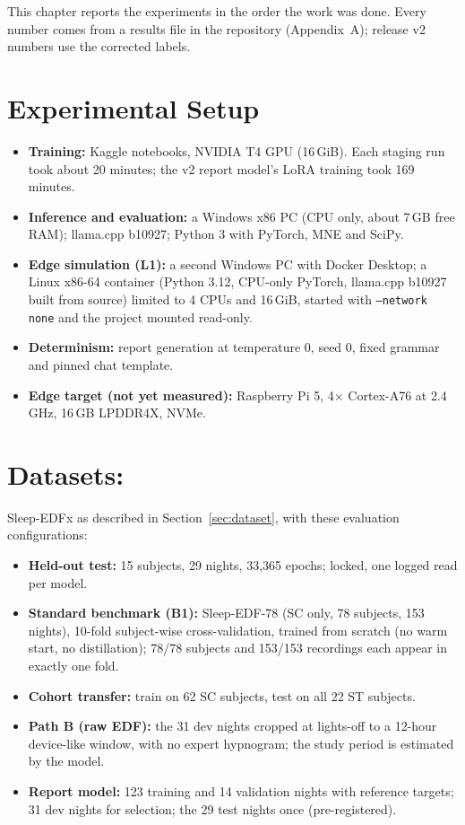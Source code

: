 \label{chap.4}
This chapter reports the experiments in the order the work was done. Every number comes from a results file in the
repository (Appendix~A); release v2 numbers use the corrected labels.

\section{Experimental Setup}

\begin{itemize}
  \item \textbf{Training:} Kaggle notebooks, NVIDIA T4 GPU (16\,GiB). Each staging run took about 20 minutes; the v2
  report model's LoRA training took 169 minutes.
  \item \textbf{Inference and evaluation:} a Windows x86 PC (CPU only, about 7\,GB free RAM); llama.cpp b10927;
  Python 3 with PyTorch, MNE and SciPy.
  \item \textbf{Edge simulation (L1):} a second Windows PC with Docker Desktop; a Linux x86-64 container (Python
  3.12, CPU-only PyTorch, llama.cpp b10927 built from source) limited to 4 CPUs and 16\,GiB, started with
  \texttt{--network none} and the project mounted read-only.
  \item \textbf{Determinism:} report generation at temperature 0, seed 0, fixed grammar and pinned chat template.
  \item \textbf{Edge target (not yet measured):} Raspberry Pi 5, 4$\times$ Cortex-A76 at 2.4\,GHz, 16\,GB LPDDR4X, NVMe.
\end{itemize}

\section{Datasets:}

Sleep-EDFx as described in Section~\ref{sec:dataset}, with these evaluation configurations:
\begin{itemize}
  \item \textbf{Held-out test:} 15 subjects, 29 nights, 33,365 epochs; locked, one logged read per model.
  \item \textbf{Standard benchmark (B1):} Sleep-EDF-78 (SC only, 78 subjects, 153 nights), 10-fold subject-wise
  cross-validation, trained from scratch (no warm start, no distillation); 78/78 subjects and 153/153 recordings
  each appear in exactly one fold.
  \item \textbf{Cohort transfer:} train on 62 SC subjects, test on all 22 ST subjects.
  \item \textbf{Path B (raw EDF):} the 31 dev nights cropped at lights-off to a 12-hour device-like window, with no
  expert hypnogram; the study period is estimated by the model.
  \item \textbf{Report model:} 123 training and 14 validation nights with reference targets; 31 dev nights for
  selection; the 29 test nights once (pre-registered).
\end{itemize}

